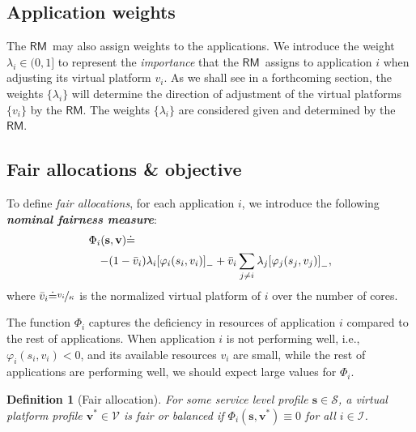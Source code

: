 \documentclass[letter,11pt]{article}
\newtheorem{definition}{Definition}[section]
\begin{document}
\subsection{Application weights}
\label{sec:lambdaI}

The {$\mathsf{RM}$}\ may also assign weights to the applications. We introduce the weight $\lambda_i\in(0,1]$ to represent the \emph{importance} that the {$\mathsf{RM}$}\ assigns to application $i$ when adjusting its virtual platform $v_i$.  As we shall see in a forthcoming section, the weights $\{\lambda_i\}$ will determine the
direction of adjustment of the virtual platforms $\{v_i\}$ by the {$\mathsf{RM}$}. 
The weights $\{\lambda_i\}$ are considered given and determined by the {$\mathsf{RM}$}. 

\subsection{Fair allocations \& objective}	\label{sec:FairAllocations}

To define \emph{fair allocations}, for each application $i$, we introduce the following \emph{\textbf{nominal fairness measure}}:
 \begin{eqnarray} \label{eq:FairAllocationMeasure} 
  \lefteqn{{\Phi}_i({\mathbf{s}},{\mathbf{v}}) {\doteq}}\cr && -(1-{\bar{v}}_i)\lambda_i{\left[{\varphi_i(s_i,v_i)}\right]_{-}} + {\bar{v}}_i \sum_{j\neq{i}}\lambda_j {\left[{\varphi_j(s_j,v_j)}\right]_{-}},
\end{eqnarray}
where ${\bar{v}}_i{\doteq}\nicefrac{v_i}{\kappa}$ is the normalized virtual platform of $i$ over the number of cores.

The function $\Phi_i$ captures the deficiency in resources of application $i$ compared to the rest of applications. When application $i$ is not performing well, i.e., $\varphi_i(s_i,v_i)<0$, and its available resources $v_i$ are small, while the rest of applications are performing well, we should expect large values for $\Phi_i$. 
\begin{definition}[Fair allocation] \label{def:FairAllocation} 
For some service level profile ${\mathbf{s}}\in\mathcal{S}$, a virtual platform profile ${\mathbf{v}}^*\in{\mathcal{V}}$ is fair or balanced if $\Phi_i({\mathbf{s}},{\mathbf{v}}^*)\equiv{0}$ for all $i\in\mathcal{I}$.
\end{definition}
\end{document}
